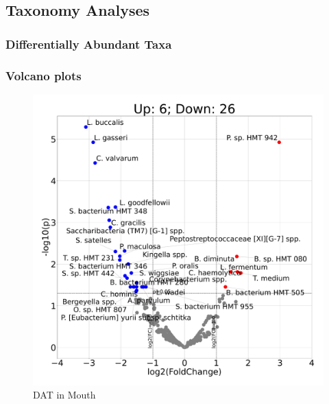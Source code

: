\documentclass{beamer}
\begin{document}
    \subsection{Taxonomy Analyses}
    \subsubsection{Differentially Abundant Taxa}
    \begin{frame}
        \frametitle{Volcano plots}

        \begin{figure}
            \includegraphics[width=0.5 \linewidth]{figures/Step44/singleton.DADA2.homd.uncorrected.Mouth.pdf}
            \caption{DAT in Mouth}
        \end{figure}
    \end{frame}
\end{document}
